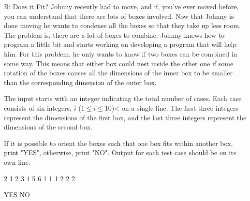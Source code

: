 \begin{problem}{B: Does it Fit?}
Johnny recently had to move, and if, you've ever moved before, you can understand that there are lots of boxes involved. 
Now that Johnny is done moving he wants to condense all the boxes so that they take up less room. 
The problem is, there are a lot of boxes to combine. 
Johnny knows how to program a little bit and starts working on developing a program that will help him. For this problem, he only wants to know if two boxes can be combined in some way. 
This means that either box could nest inside the other one if some rotation of the boxes causes all the dimensions of the inner box to be smaller than the corresponding dimension of the outer box.
\end{problem}

\begin{formalin}
The input starts with an integer indicating the total number of cases. 
Each case consists of six integers, $i$ ($1 \leq i \leq 10$)< on a single line. 
The first three integers represent the dimensions of the first box, and the last three integers represent the dimensions of the second box.
\end{formalin}

\begin{formalout}
If it is possible to orient the boxes such that one box fits within another box, print "YES", otherwise, print "NO". 
Output for each test case should be on its own line.
\end{formalout}

\begin{datain}
2
1 2 3 4 5 6
1 1 1 2 2 2
\end{datain}

\begin{dataout}
YES
NO
\end{dataout}

